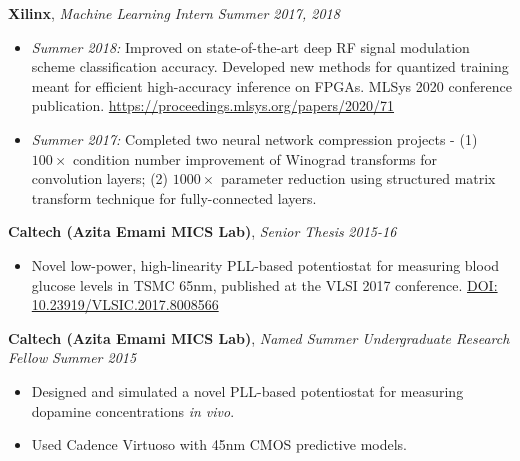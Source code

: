 \documentclass{article}
\newenvironment{changemargin}[2]{%
  \begin{list}{}{%
    \setlength{\topsep}{0pt}%
    \setlength{\leftmargin}{#1}%
    \setlength{\rightmargin}{#2}%
    \setlength{\listparindent}{\parindent}%
    \setlength{\itemindent}{\parindent}%
    \setlength{\parsep}{\parskip}%
  }%
  \item[]}{\end{list}
}
\newenvironment{body} {
	\vspace*{-16pt}
	\begin{changemargin}{-0.25in}{-0.5in}
  }	
	{\end{changemargin}
}
\begin{document}
\begin{body}
	\smallskip
	
	\textbf{Xilinx}, \emph{Machine Learning Intern} \hfill \emph{Summer 2017, 2018}\\
	\vspace*{-4pt}
	\begin{itemize}
		\item \emph{Summer 2018:} Improved on state-of-the-art deep RF signal modulation scheme classification accuracy. Developed new methods for quantized training meant for efficient high-accuracy inference on FPGAs. MLSys 2020 conference publication. \url{https://proceedings.mlsys.org/papers/2020/71}
		\item \emph{Summer 2017:} Completed two neural network compression projects - (1) $100\times$ condition number improvement of Winograd transforms for convolution layers; (2) $1000\times$ parameter reduction using structured matrix transform technique for fully-connected layers.
	\end{itemize}
	
%	

	\smallskip

	\textbf{Caltech (Azita Emami MICS Lab)}, \emph{Senior Thesis} \hfill \emph{2015-16}\\
	\vspace*{-4pt}
	\begin{itemize}
		\item Novel low-power, high-linearity PLL-based potentiostat for measuring blood glucose levels in TSMC 65nm, published at the VLSI 2017 conference. \url{DOI: 10.23919/VLSIC.2017.8008566}
	\end{itemize}

	\smallskip

	\textbf{Caltech (Azita Emami MICS Lab)}, \emph{Named Summer Undergraduate Research Fellow} \hfill \emph{Summer 2015}\\
	\vspace*{-4pt}
	\begin{itemize}
		\item Designed and simulated a novel PLL-based potentiostat for measuring dopamine concentrations \emph{in vivo}.
		\item Used Cadence Virtuoso with 45nm CMOS predictive models. %
	\end{itemize}


\end{body}
\end{document}
